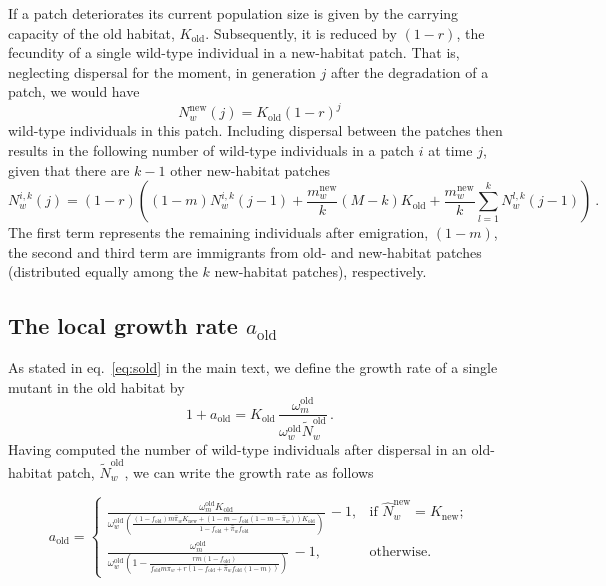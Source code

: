 \documentclass[a4paper,11pt]{scrartcl}
\newcommand{\chg}[1]{\textcolor{change}{#1}}
\begin{document}
\chg{If a patch deteriorates its current population size is given by the carrying capacity of the old habitat, $K_{\text{old}}$. Subsequently, it is reduced by $(1-r)$, the fecundity of a single wild-type individual in a new-habitat patch. That is, neglecting dispersal for the moment, in generation $j$ after the degradation of a patch, we would have 
\begin{equation}
    N_w^{\text{new}}(j) = K_{\text{old}}(1-r)^j
\end{equation}
wild-type individuals in this patch. Including dispersal between the patches then results in the following number of wild-type individuals in a patch $i$ at time $j$, given that there are $k-1$ other new-habitat patches
\begin{equation}
    N_w^{i,k}(j) = (1-r)\left((1-m)N_w^{i,k}(j-1) + \frac{m_w^{\text{new}}}{k} (M-k) K_{\text{old}} + \frac{m_w^{\text{new}}}{k} \sum_{l=1}^k N_w^{l,k}(j-1) \right)\ .
\end{equation}
The first term represents the remaining individuals after emigration, $(1-m)$, the second and third term are immigrants from old- and new-habitat patches (distributed equally among the $k$ new-habitat patches), respectively. 
}

\subsection*{The local growth rate $a_{\text{old}}$}
As stated in eq.~\eqref{eq:sold} in the main text, we define the growth rate of a single mutant in the old habitat by
\begin{equation}
    1 + a_{\text{old}} = K_{\text{old}}\, \frac{\omega^\text{old}_m}{\omega^\text{old}_w \widetilde{N}_w^{\text{old}}}\, .    
\end{equation}
%
Having computed the number of wild-type individuals after dispersal in an old-habitat patch, $\widetilde{N}_w^{\text{old}}$, we can write the growth rate as follows

\begin{equation}\label{Seq:s_old}
    a_{\text{old}} = \left\{ \begin{array}{ll}
        \frac{\omega^\text{old}_m K_{\text{old}}}{\omega^\text{old}_w \left(\frac{(1-f_{\text{old}})m\widehat{\pi}_w K_{\text{new}} + (1-m-f_{\text{old}}(1-m-\widehat{\pi}_w))K_{\text{old}}}{1-f_{\text{old}}+\widehat{\pi}_w f_{\text{old}}} \right)}\, - 1 , & \text{if } \widehat{N}_w^{\text{new}} = K_{\text{new}};  \\
        \frac{\omega^\text{old}_m}{\omega^\text{old}_w \left(1 - \frac{rm(1-f_{\text{old}})}{f_{\text{old}}m\widehat{\pi}_w + r(1-f_{\text{old}}+\widehat{\pi}_w f_{\text{old}}(1-m))}\right)}\, - 1 , & \text{otherwise}. 
    \end{array}
    \right.
\end{equation}
\end{document}
